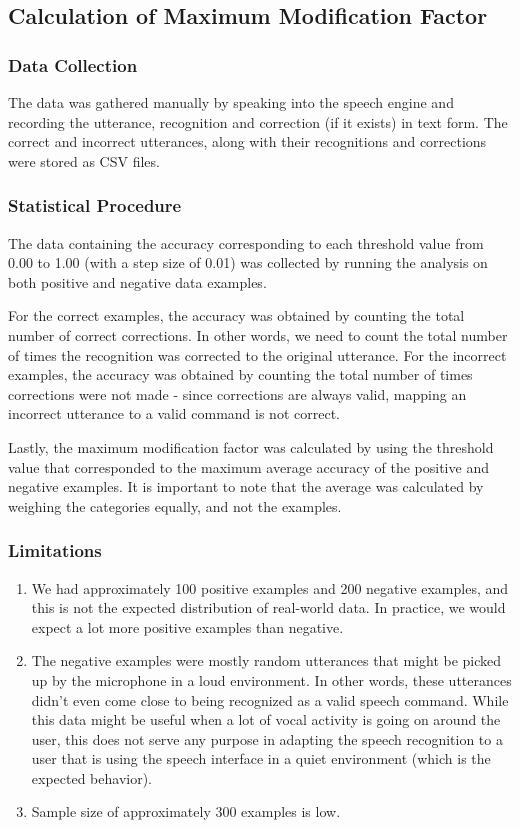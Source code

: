 \documentclass[]{article}
\begin{document}
\subsection{Calculation of Maximum Modification Factor}

\subsubsection{Data Collection}
The data was gathered manually by speaking into the speech engine and recording the utterance, recognition and correction (if it exists) in text form.
The correct and incorrect utterances, along with their recognitions and corrections were stored as CSV files. 
\subsubsection{Statistical Procedure}
The data containing the accuracy corresponding to each threshold value from 0.00 to 1.00 (with a step size of 0.01) was collected by running the analysis on both positive and negative data examples.

For the correct examples, the accuracy was obtained by counting the total number of correct corrections. In other words, we need to count the total number of times the recognition was corrected to the original utterance. For the incorrect examples, the accuracy was obtained by counting the total number of times corrections were not made - since corrections are always valid, mapping an incorrect utterance to a valid command is not correct.

Lastly, the maximum modification factor was calculated by using the threshold value that corresponded to the maximum average accuracy of the positive and negative examples. It is important to note that the average was calculated by weighing the categories equally, and not the examples.

\subsubsection{Limitations}
\begin{enumerate}
\item We had approximately 100 positive examples and 200 negative examples, and this is not the expected distribution of real-world data. In practice, we would expect a lot more positive examples than negative.
\item The negative examples were mostly random utterances that might be picked up by the microphone in a loud environment. In other words, these utterances didn't even come close to being recognized as a valid speech command. While this data might be useful when a lot of vocal activity is going on around the user, this does not serve any purpose in adapting the speech recognition to a user that is using the speech interface in a quiet environment (which is the expected behavior).
\item Sample size of approximately 300 examples is low.
\end{enumerate}
\end{document}
